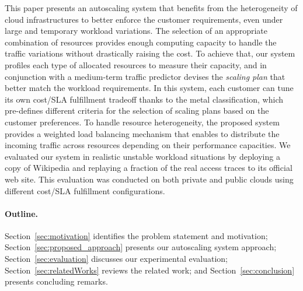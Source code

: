 This paper presents an autoscaling system that benefits from the
heterogeneity of cloud infrastructures to better enforce the customer
requirements, even under large and temporary workload variations. The
selection of an appropriate combination of resources provides enough
computing capacity to handle the traffic variations without
drastically raising the cost. To achieve that, our system profiles
each type of allocated resources to measure their capacity, and in
conjunction with a medium-term traffic predictor devises
the \emph{scaling plan} that better match the workload
requirements. In this system, each customer can tune its own cost/SLA
fulfillment tradeoff thanks to the metal classification, which
pre-defines different criteria for the selection of scaling plans
based on the customer preferences. To handle resource heterogeneity,
the proposed system provides a weighted load balancing mechanism that
enables to distribute the incoming traffic across resources depending
on their performance capacities. We evaluated our system in realistic
unstable workload situations by deploying a copy of Wikipedia and
replaying a fraction of the real access traces to its official web
site. This evaluation was conducted on both private and public clouds
using different cost/SLA fulfillment configurations.


\paragraph{Outline.} 

Section~\ref{sec:motivation} identifies the problem statement and
motivation; Section~\ref{sec:proposed_approach} presents our
autoscaling system approach; Section~\ref{sec:evaluation} discusses
our experimental evaluation; Section~\ref{sec:relatedWorks} reviews
the related work; and Section~\ref{sec:conclusion} presents concluding
remarks.
